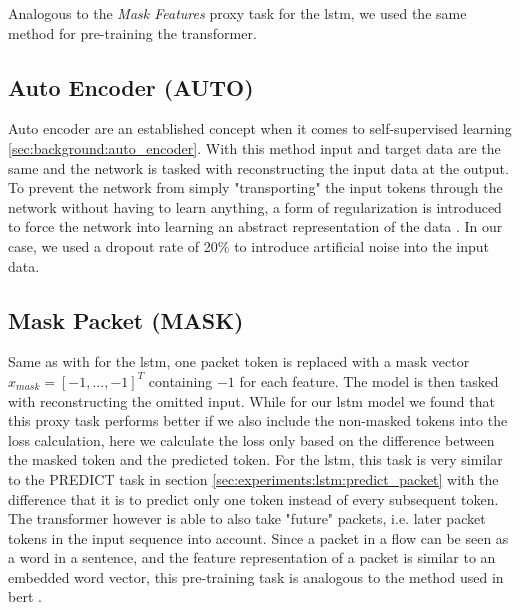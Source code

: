 Analogous to the \textit{Mask Features} proxy task for the \gls{lstm}, we used the same method for pre-training the transformer.

\subsection{Auto Encoder (AUTO)} \label{sec:experiments:transformer:auto_encoder}

Auto encoder are an established concept when it comes to self-supervised learning \ref{sec:background:auto_encoder}. With this method input and target data are the same and the network is tasked with reconstructing the input data at the output. To prevent the network from simply "transporting" the input tokens through the network without having to learn anything, a form of regularization is introduced to force the network into learning an abstract representation of the data \cite{autoencoders}. In our case, we used a dropout rate of 20\% to introduce artificial noise into the input data. 

\subsection{Mask Packet (MASK)} \label{sec:experiments:transformer:mask_packet}

Same as with for the \gls{lstm}, one packet token is replaced with a mask vector $x_{mask} = [-1, ..., -1]^T$ containing $-1$ for each feature. The model is then tasked with reconstructing the omitted input. While for our \gls{lstm} model we found that this proxy task performs better if we also include the non-masked tokens into the loss calculation, here we calculate the loss only based on the difference between the masked token and the predicted token. For the \gls{lstm}, this task is very similar to the PREDICT task in section \ref{sec:experiments:lstm:predict_packet} with the difference that it is to predict only one token instead of every subsequent token. The transformer however is able to also take "future" packets, i.e. later packet tokens in the input sequence into account.
Since a packet in a flow can be seen as a word in a sentence, and the feature representation of a packet is similar to an embedded word vector, this pre-training task is analogous to the method used in \gls{bert} \cite{bert}. 

\newpage
